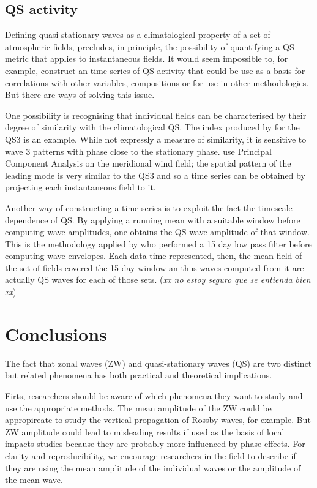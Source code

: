\documentclass[draft,linenumbers]{agujournal2018}
\begin{document}
\subsection{QS activity}

Defining quasi-stationary waves as a climatological property of a set of
atmospheric fields, precludes, in principle, the possibility of
quantifying a QS metric that applies to instantaneous fields. It would
seem impossible to, for example, construct an time series of QS activity
that could be use as a basis for correlations with other variables,
compositions or for use in other methodologies. But there are ways of
solving this issue.

One possibility is recognising that individual fields can be
characterised by their degree of similarity with the climatological QS.
The index produced by \citet{Raphael2004} for the QS3 is an example.
While not expressly a measure of similarity, it is sensitive to wave 3
patterns with phase close to the stationary phase. \citet{Yuan2008} use
Principal Component Analysis on the meridional wind field; the spatial
pattern of the leading mode is very similar to the QS3 and so a time
series can be obtained by projecting each instantaneous field to it.

Another way of constructing a time series is to exploit the fact the
timescale dependence of QS. By applying a running mean with a suitable
window before computing wave amplitudes, one obtains the QS wave
amplitude of that window. This is the methodology applied by
\citet{Wolf2018} who performed a 15 day low pass filter before computing
wave envelopes. Each data time represented, then, the mean field of the
set of fields covered the 15 day window an thus waves computed from it
are actually QS waves for each of those sets. (\emph{xx no estoy seguro
que se entienda bien xx})

\section{Conclusions}

The fact that zonal waves (ZW) and quasi-stationary waves (QS) are two
distinct but related phenomena has both practical and theoretical
implications.

Firts, researchers should be aware of which phenomena they want to study
and use the appropriate methods. The mean amplitude of the ZW could be
appropireate to study the vertical propagation of Rossby waves, for
example. But ZW amplitude could lead to misleading results if used as
the basis of local impacts studies because they are probably more
influenced by phase effects. For clarity and reproducibility, we
encourage researchers in the field to describe if they are using the
mean amplitude of the individual waves or the amplitude of the mean
wave.
\end{document}
